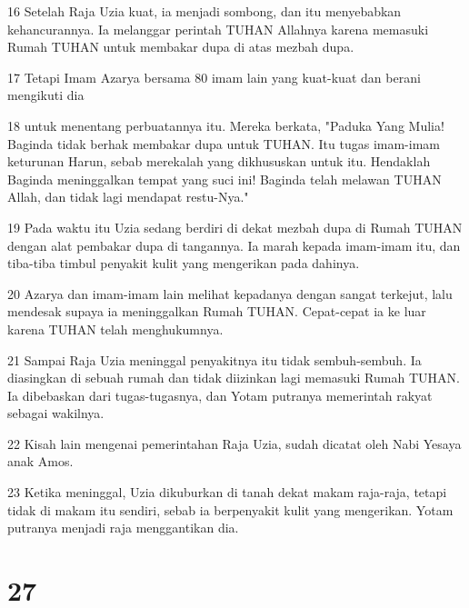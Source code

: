 \par 16 Setelah Raja Uzia kuat, ia menjadi sombong, dan itu menyebabkan kehancurannya. Ia melanggar perintah TUHAN Allahnya karena memasuki Rumah TUHAN untuk membakar dupa di atas mezbah dupa.
\par 17 Tetapi Imam Azarya bersama 80 imam lain yang kuat-kuat dan berani mengikuti dia
\par 18 untuk menentang perbuatannya itu. Mereka berkata, "Paduka Yang Mulia! Baginda tidak berhak membakar dupa untuk TUHAN. Itu tugas imam-imam keturunan Harun, sebab merekalah yang dikhususkan untuk itu. Hendaklah Baginda meninggalkan tempat yang suci ini! Baginda telah melawan TUHAN Allah, dan tidak lagi mendapat restu-Nya."
\par 19 Pada waktu itu Uzia sedang berdiri di dekat mezbah dupa di Rumah TUHAN dengan alat pembakar dupa di tangannya. Ia marah kepada imam-imam itu, dan tiba-tiba timbul penyakit kulit yang mengerikan pada dahinya.
\par 20 Azarya dan imam-imam lain melihat kepadanya dengan sangat terkejut, lalu mendesak supaya ia meninggalkan Rumah TUHAN. Cepat-cepat ia ke luar karena TUHAN telah menghukumnya.
\par 21 Sampai Raja Uzia meninggal penyakitnya itu tidak sembuh-sembuh. Ia diasingkan di sebuah rumah dan tidak diizinkan lagi memasuki Rumah TUHAN. Ia dibebaskan dari tugas-tugasnya, dan Yotam putranya memerintah rakyat sebagai wakilnya.
\par 22 Kisah lain mengenai pemerintahan Raja Uzia, sudah dicatat oleh Nabi Yesaya anak Amos.
\par 23 Ketika meninggal, Uzia dikuburkan di tanah dekat makam raja-raja, tetapi tidak di makam itu sendiri, sebab ia berpenyakit kulit yang mengerikan. Yotam putranya menjadi raja menggantikan dia.

\chapter{27}

